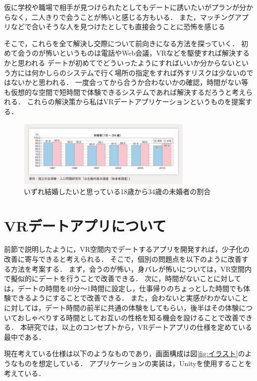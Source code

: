 \documentclass[12pt]{ltjsarticle}
\begin{document}
仮に学校や職場で相手が見つけられたとしてもデートに誘いたいがプランが分からなく，二人きりで会うことが怖いと感じる方もいる．
また，マッチングアプリなどで合いそうな人を見つけたとしても直接会うことに恐怖を感じる


そこで，これらを全て解決し交際について前向きになる方法を探っていく．
初めて会うのが怖いというものは電話やWeb会議，VRなどを駆使すれば解決するかと思われる
デートが初めてでどういったようにすればいいか分からないという方には何かしらのシステムで行く場所の指定をすれば外すリスクは少ないのではないかと思われる．
一度会ってから合うか合わないかの確認，時間がない\cite{chou2014}等も仮想的な空間で短時間で体験できるシステムであれば解決するだろうと考えられる．
これらの解決策から私はVRデートアプリケーションというものを提案する．
\begin{figure}[h]
\centering
 \includegraphics[width=85mm]{iyoku.jpg}
 \caption{いずれ結婚したいと思っている18歳から34歳の未婚者の割合}
 \label{fig:教科書}
\end{figure}

\section{VRデートアプリについて}
前節で説明したように，VR空間内でデートするアプリを開発すれば，少子化の改善に寄与できると考えられる．
そこで，個別の問題点を以下のように改善する方法を考案する．
まず，会うのが怖い，身バレが怖いについては，VR空間内で擬似的にデートを行うことで改善できる．
次に，時間がないことに対しては，デートの時間を40分〜1時間に設定し，仕事帰りのちょっとした時間でも体験できるようにすることで改善できる．
また，会わないと実感がわかないことに対しては，デート時間の前半に共通の体験をしてもらい，後半はその体験についておしゃべりする時間としてお互いの性格を知る機会を設けることで改善できる．
本研究では，以上のコンセプトから，VRデートアプリの仕様を定めている最中である．

現在考えている仕様は以下のようなものであり，画面構成は図\ref{fig:イラスト}のようなものを想定している．
アプリケーションの実装は，Unityを使用することを考えている．
\end{document}
